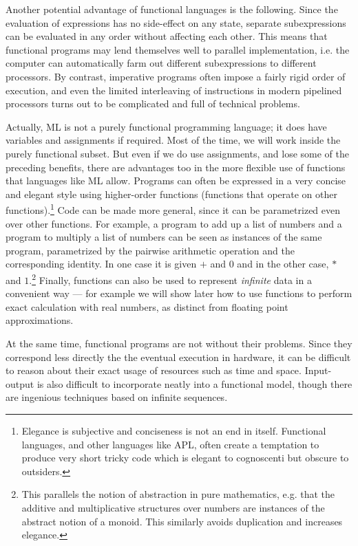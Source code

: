 Another potential advantage of functional languages is the following. Since the
evaluation of expressions has no side-effect on any state, separate
subexpressions can be evaluated in any order without affecting each other. This
means that functional programs may lend themselves well to parallel
implementation, i.e. the computer can automatically farm out different
subexpressions to different processors. By contrast, imperative programs often
impose a fairly rigid order of execution, and even the limited interleaving of
instructions in modern pipelined processors turns out to be complicated and
full of technical problems.

Actually, ML is not a purely functional programming language; it does have
variables and assignments if required. Most of the time, we will work inside
the purely functional subset. But even if we do use assignments, and lose some
of the preceding benefits, there are advantages too in the more flexible use of
functions that languages like ML allow. Programs can often be expressed in a
very concise and elegant style using higher-order functions (functions that
operate on other functions).\footnote{Elegance is subjective and conciseness is
not an end in itself. Functional languages, and other languages like APL, often
create a temptation to produce very short tricky code which is elegant to
cognoscenti but obscure to outsiders.} Code can be made more general, since it
can be parametrized even over other functions. For example, a program to add up
a list of numbers and a program to multiply a list of numbers can be seen as
instances of the same program, parametrized by the pairwise arithmetic
operation and the corresponding identity. In one case it is given $+$ and $0$
and in the other case, $*$ and $1$.\footnote{This parallels the notion of
abstraction in pure mathematics, e.g. that the additive and multiplicative
structures over numbers are instances of the abstract notion of a monoid. This
similarly avoids duplication and increases elegance.} Finally, functions can
also be used to represent {\em infinite} data in a convenient way --- for
example we will show later how to use functions to perform exact calculation
with real numbers, as distinct from floating point approximations.

At the same time, functional programs are not without their problems. Since
they correspond less directly the the eventual execution in hardware, it can be
difficult to reason about their exact usage of resources such as time and
space. Input-output is also difficult to incorporate neatly into a functional
model, though there are ingenious techniques based on infinite sequences.

